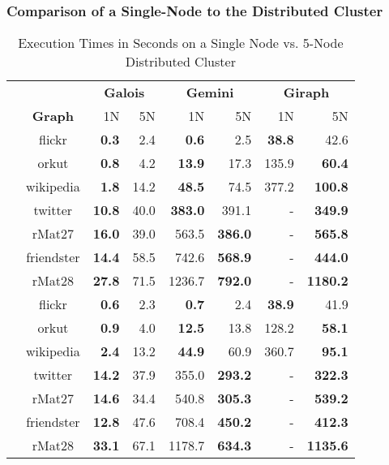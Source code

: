 





\subsubsection{Comparison of a Single-Node to the Distributed Cluster}
\begin{table}
	\caption{Execution Times in Seconds on a Single Node vs. 5-Node Distributed Cluster}
	\label{tbl:execTimeComparison}
	\renewcommand{\arraystretch}{1.2}
	\centering
	\begin{tabular}{ccr@{\tabskip 1 \tabcolsep}r
	r@{\tabskip 1 \tabcolsep}r
	r@{\tabskip 1 \tabcolsep}r}
		\toprule
		&&\multicolumn{2}{c}{\bf Galois}&\multicolumn{2}{c}{\bf Gemini}&\multicolumn{2}{c}{\bf Giraph}\\
		\cmidrule{3-4}\cmidrule{5-6}\cmidrule{7-8}
		&\bf Graph&1N&5N&1N&5N&1N&5N\\
		\midrule
		\multirow{7}{0.5ex}{\rotatebox{90}{\bf SSSP}}&flickr & \bf 0.3 & 2.4 & \bf 0.6 & 2.5 & \bf 38.8 & 42.6 \\
		& orkut & \bf 0.8 & 4.2 & \bf 13.9 & 17.3 & 135.9 & \bf 60.4 \\
		& wikipedia & \bf 1.8 & 14.2 & \bf 48.5 & 74.5 & 377.2 & \bf 100.8 \\
		& twitter & \bf 10.8 & 40.0 & \bf 383.0 & 391.1 & - & \bf 349.9 \\
		& rMat27 & \bf 16.0 & 39.0 & 563.5 & \bf 386.0 & - & \bf 565.8 \\
		& friendster & \bf 14.4 & 58.5 & 742.6 & \bf 568.9 & - & \bf 444.0 \\
		& rMat28 & \bf 27.8 & 71.5 & 1236.7 & \bf 792.0 & - & \bf 1180.2 \\
		\midrule
		\multirow{7}{0.5ex}{\rotatebox{90}{\bf BFS}}& flickr & \bf 0.6 & 2.3 & \bf 0.7 & 2.4 & \bf 38.9 & 41.9 \\
		& orkut & \bf 0.9 & 4.0 & \bf 12.5 & 13.8 & 128.2 & \bf 58.1 \\
		& wikipedia & \bf 2.4 & 13.2 & \bf 44.9 & 60.9 & 360.7 & \bf 95.1 \\
		& twitter & \bf 14.2 & 37.9 & 355.0 & \bf 293.2 & - & \bf 322.3 \\
		& rMat27 & \bf 14.6 & 34.4 & 540.8 & \bf 305.3 & - & \bf 539.2 \\
		& friendster & \bf 12.8 & 47.6 & 708.4 & \bf 450.2 & - & \bf 412.3 \\
		& rMat28 & \bf 33.1 & 67.1 & 1178.7 & \bf 634.3 & - & \bf 1135.6 \\

\end{tabular}
\end{table}
